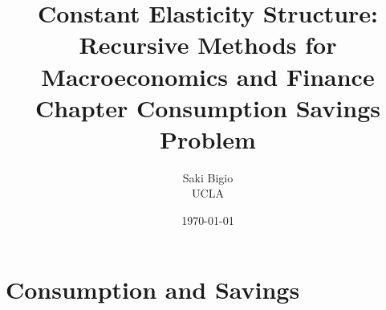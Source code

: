 \documentclass[12pt,openany]{book}
\title{Constant Elasticity Structure: \\ Recursive Methods for Macroeconomics and Finance \\ Chapter Consumption Savings Problem}
\author{Saki Bigio \\UCLA}
\date{\today}
\begin{document}
\frontmatter
\maketitle

\tableofcontents

\mainmatter

\chapter{Consumption and Savings}
\label{ch:consumption-savings}



\backmatter


\end{document}
